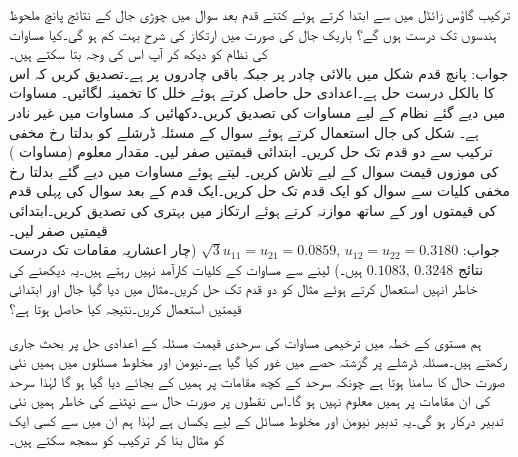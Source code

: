 \quad
ترکیب گاؤس زائڈل میں  سے ابتدا کرتے ہوئے کتنے قدم بعد سوال  میں چوڑی جال کے نتائج پانچ ملحوظ ہندسوں تک درست ہوں گے؟ باریک جال کی صورت میں ارتکاز کی شرح بہت کم ہو گی۔کیا مساوات کی نظام کو دیکھ کر آپ اس کی وجہ بتا سکتے ہیں۔\\
جواب:\quad
پانچ قدم
شکل  میں بالائی چادر پر  جبکہ باقی چادروں پر  ہے۔تصدیق کریں کہ اس کا بالکل درست حل  ہے۔اعدادی حل حاصل کرتے ہوئے خلل کا تخمینہ لگائیں۔
\quad 
مساوات  میں دیے گئے نظام کے لیے مساوات  کی تصدیق کریں۔دکھائیں کہ مساوات  میں  غیر نادر ہے۔ 
\quad
شکل  کی جال استعمال کرتے ہوئے سوال  کے مسئلہ ڈرشلے  کو بدلتا رخ مخفی ترکیب سے دو قدم تک حل کریں۔  ابتدائی قیمتیں صفر لیں۔
\quad
مقدار معلوم  (مساوات ) کی موزوں قیمت  سوال  کے لیے تلاش کریں۔ لیتے ہوئے مساوات  میں دیے گئے بدلتا رخ مخفی کلیات سے سوال   کو ایک قدم تک حل کریں۔ایک قدم کے بعد سوال  کی پہلی قدم کی قیمتوں  اور  کے ساتھ موازنہ کرتے ہوئے ارتکاز میں بہتری کی تصدیق کریں۔ابتدائی قیمتیں صفر لیں۔\\
جواب:\quad
$\sqrt{3}u_{11}=u_{21}=0.0859,\, u_{12}=u_{22}=0.3180$
(چار اعشاریہ مقامات تک درست نتائج 
$0.1083,\,0.3248$
ہیں۔) 
\quad
{} لینے سے مساوات  کے کلیات کارآمد نہیں رہتے ہیں۔یہ دیکھنے کی خاطر انہیں استعمال کرتے ہوئے مثال  کو دو قدم تک حل کریں۔مثال میں دیا گیا جال اور ابتدائی قیمتیں استعمال کریں۔نتیجہ کیا حاصل ہوتا ہے؟

ہم  مستوی کے خطہ  میں ترخیمی مساوات کی سرحدی قیمت مسئلہ کے اعدادی حل پر بحث جاری رکھتے ہیں۔مسئلہ ڈرشلے پر گزشتہ حصے میں غور کیا گیا ہے۔نیومن اور مخلوط مسئلوں میں ہمیں نئی صورت حال کا سامنا ہوتا ہے چونکہ سرحد کے کچھ مقامات پر ہمیں  کے بجائے   دیا گیا ہو گا لہٰذا سرحد کی ان مقامات پر ہمیں  معلوم نہیں ہو گا۔اس نقطوں پر صورت حال سے نپٹنے کی خاطر ہمیں نئی تدبیر درکار ہو گی۔یہ تدبیر نیومن اور مخلوط مسائل کے لیے یکساں ہے لہٰذا ہم ان میں سے کسی ایک کو مثال بنا کر ترکیب کو سمجھ سکتے ہیں۔

